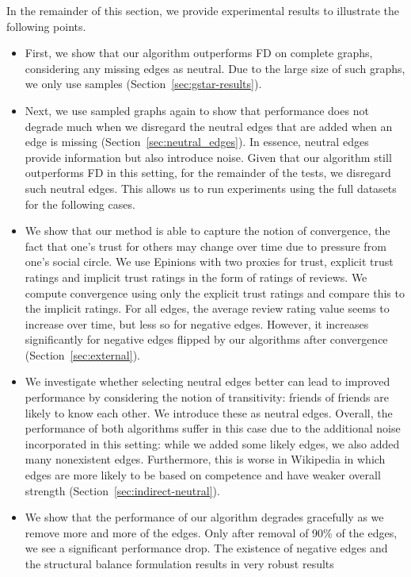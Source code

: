 \documentclass[acmtweb]{acmsmall}
\begin{document}
In the remainder of this section, we provide experimental
  results to illustrate the following points.
\begin{itemize}
\item First, we show that our algorithm outperforms FD on complete
  graphs, considering any missing edges as neutral. Due to the large
  size of such graphs, we only use samples
  (Section~\ref{sec:gstar-results}).
\item Next, we use sampled graphs again to show that performance does
  not degrade much when we disregard the neutral edges that are added
  when an edge is missing (Section~\ref{sec:neutral_edges}). In
  essence, neutral edges provide information but also introduce
  noise. Given that our algorithm still outperforms FD in this
  setting, for the remainder of the tests, we disregard such neutral
  edges. This allows us to run experiments using the full datasets
  for the following cases.
\item We show that our method is able to capture the notion of
  convergence, the fact that one's trust for others may change over
  time due to pressure from one's social circle. We use Epinions with
  two proxies for trust, explicit trust ratings and implicit trust
  ratings in the form of ratings of reviews.  We compute convergence
  using only the explicit trust ratings and compare this to the implicit
  ratings. For all edges, the average review rating value seems to
  increase over time, but less so for negative edges. However, it
  increases significantly for negative edges flipped by our algorithms
  after convergence (Section~\ref{sec:external}).
\item We investigate whether selecting neutral edges better can lead
  to improved performance by considering the notion of transitivity:
  friends of friends are likely to know each other. We introduce these
  as neutral edges. Overall, the performance of both algorithms suffer
  in this case due to the additional noise incorporated in this
  setting: while we added some likely edges, we also added many
  nonexistent edges. Furthermore, this is worse in Wikipedia in which
  edges are more likely to be based on competence and have weaker
  overall strength (Section~\ref{sec:indirect-neutral}).
\item We show that the performance of our algorithm degrades
  gracefully as we remove more and more of the edges. Only after
  removal of 90\% of the edges, we see a significant performance
  drop. The existence of negative edges and the structural balance
  formulation results in very robust results

\end{itemize}
\end{document}
